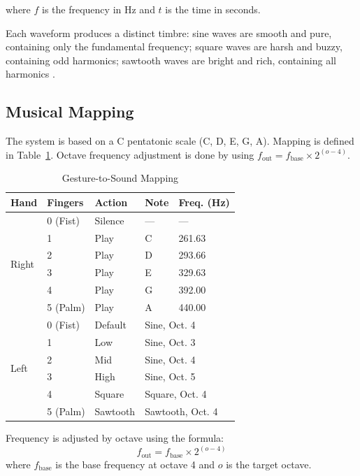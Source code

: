 \documentclass[conference]{IEEEtran}
\begin{document}
where $f$ is the frequency in Hz and $t$ is the time in seconds.

Each waveform produces a distinct timbre: sine waves are smooth and pure, containing only the fundamental frequency; square waves are harsh and buzzy, containing odd harmonics; sawtooth waves are bright and rich, containing all harmonics \cite{smith2007mathematics}.

\subsection{Musical Mapping}

The system is based on a C pentatonic scale (C, D, E, G, A). Mapping is defined in Table~\ref{tab:gesture_mapping}. Octave frequency adjustment is done by using $f_{\text{out}} = f_{\text{base}} \times 2^{(o-4)}$.

\begin{table}[htbp]
\caption{Gesture-to-Sound Mapping}
\label{tab:gesture_mapping}
\centering
\begin{tabular}{p{0.8cm}p{1.5cm}p{1.2cm}p{1cm}p{1.5cm}}
\toprule
\textbf{Hand} & \textbf{Fingers} & \textbf{Action} & \textbf{Note} & \textbf{Freq. (Hz)} \\
\midrule
\multirow{6}{*}{Right} & 0 (Fist) & Silence & --- & --- \\
 & 1 & Play & C & 261.63 \\
 & 2 & Play & D & 293.66 \\
 & 3 & Play & E & 329.63 \\
 & 4 & Play & G & 392.00 \\
 & 5 (Palm) & Play & A & 440.00 \\
\midrule
\multirow{6}{*}{Left} & 0 (Fist) & Default & \multicolumn{2}{l}{Sine, Oct. 4} \\
 & 1 & Low & \multicolumn{2}{l}{Sine, Oct. 3} \\
 & 2 & Mid & \multicolumn{2}{l}{Sine, Oct. 4} \\
 & 3 & High & \multicolumn{2}{l}{Sine, Oct. 5} \\
 & 4 & Square & \multicolumn{2}{l}{Square, Oct. 4} \\
 & 5 (Palm) & Sawtooth & \multicolumn{2}{l}{Sawtooth, Oct. 4} \\
\bottomrule
\end{tabular}
\end{table}

Frequency is adjusted by octave using the formula:
\begin{equation}
f_{\text{out}} = f_{\text{base}} \times 2^{(o - 4)}
\label{eq:octave}
\end{equation}
where $f_{\text{base}}$ is the base frequency at octave 4 and $o$ is the target octave.
\end{document}
